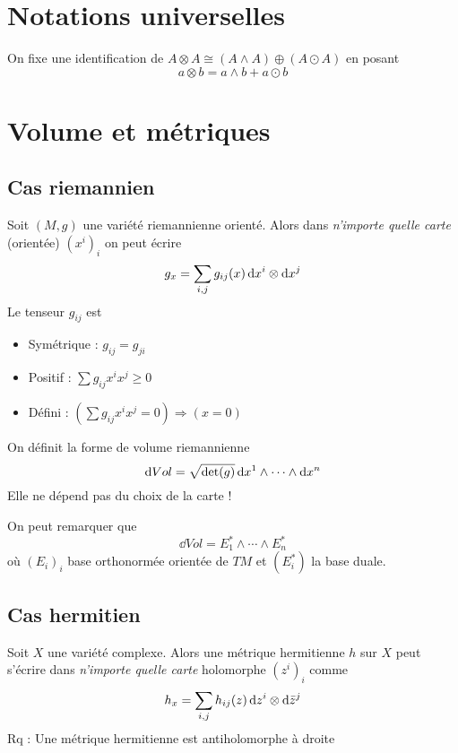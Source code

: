 \documentclass[12pt,makeidx]{amsart}
\begin{document}
\section{Notations universelles}
\medskip
\begin{center}
\fbox{$\tau = 2\pi$}
\end{center}
\medskip

On fixe une identification de $A \otimes A \cong \left(A \wedge A\right) \oplus \left(A \odot A\right)$ en posant
\[
a \otimes b = a \wedge b + a \odot b
\]


\section{Volume et métriques}
\subsection{Cas riemannien}
Soit $(M,g)$ une variété riemannienne orienté. Alors dans \textit{n'importe quelle carte} (orientée) $(x^i)_i$
on peut écrire
\begin{equation}\label{MetriqueRiemann}\index{MetriqueRiemann@Métrique riemannienne}
g_x = \sum_{i,j} g_{ij}(x) \dd x^i \otimes \dd x^j
\end{equation}
Le tenseur $g_{ij}$ est
\begin{itemize}
\item Symétrique : $g_{ij} = g_{ji}$
\item Positif : $\sum g_{ij}x^ix^j \geq 0$
\item Défini : $\left(\sum g_{ij}x^ix^j = 0 \right)\Rightarrow \left(x = 0\right)$
\end{itemize}

On définit la forme de volume riemannienne 
\begin{equation}\label{VolumeRiemann}\index{VolumeRiemann@Volume riemannien}
\dd Vol = \sqrt{\det(g)} \dd x^1 \wedge \cdots \wedge \dd x^n
\end{equation}
Elle ne dépend pas du choix de la carte !

On peut remarquer que \begin{equation}
\dd Vol = E^*_1 \wedge \cdots  \wedge E^*_n
\end{equation}
où $(E_i)_i$ base orthonormée orientée de $TM$ et $(E_i^*)$ la base duale.

\subsection{Cas hermitien}
Soit $X$ une variété complexe. Alors une métrique hermitienne $h$ sur $X$ peut s'écrire dans \textit{n'importe quelle carte} holomorphe $(z^i)_i$ comme
\begin{equation}\label{MetriqueHermit}\index{MetriqueHermit@Métrique hermitienne}
h_x = \sum_{i,j} h_{ij}(z) \dd z^i \otimes \dd \bar{z}^j
\end{equation}
Rq : Une métrique hermitienne est antiholomorphe à droite
\end{document}
